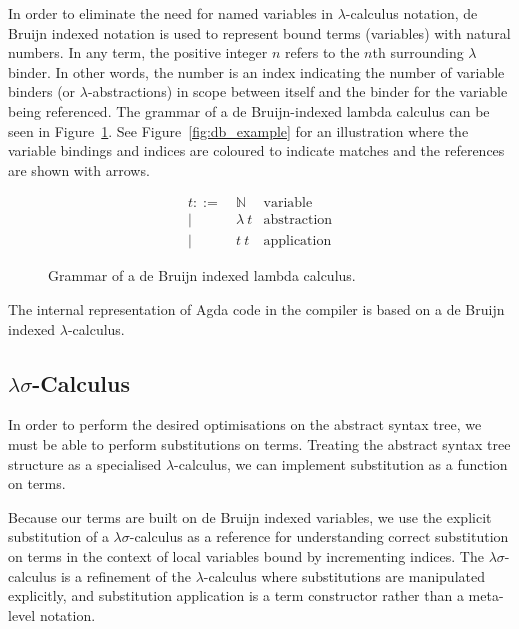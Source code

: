 In order to eliminate the need for named variables in $\lambda$-calculus notation, de Bruijn indexed notation is used to represent bound terms (variables) with natural numbers. In any term, the positive integer $n$ refers to the $n$th surrounding $\lambda$ binder.\citep{deBruijn-1972} In other words, the number is an index indicating the number of variable binders (or $\lambda$-abstractions) in scope between itself and the binder for the variable being referenced. The grammar of a de Bruijn-indexed lambda calculus can be seen in Figure~\ref{fig:db_lambda_calc}. See Figure~\ref{fig:db_example} for an illustration where the variable bindings and indices are coloured to indicate matches and the references are shown with arrows.



\begin{figure}[h]
\begin{align*}
t ::=~& \mathbb{N}      & \text{variable}\\
    |~& \lambda~t       & \text{abstraction}\\
    |~& t~t             & \text{application}
\end{align*}
\caption{Grammar of a de Bruijn indexed lambda calculus.}
\label{fig:db_lambda_calc}
\end{figure}

The internal representation of Agda code in the compiler is based on a de Bruijn indexed $\lambda$-calculus.

\subsection{$\lambda\sigma$-Calculus}

In order to perform the desired optimisations on the abstract syntax tree, we must be able to perform substitutions on terms. Treating the abstract syntax tree structure as a specialised $\lambda$-calculus, we can implement substitution as a function on terms.

Because our terms are built on de Bruijn indexed variables, we use the explicit substitution of a $\lambda\sigma$-calculus as a reference for understanding correct substitution on terms in the context of local variables bound by incrementing indices. The $\lambda\sigma$-calculus is a refinement of the $\lambda$-calculus where substitutions are manipulated explicitly, and substitution application is a term constructor rather than a meta-level notation.\citep{Abadi-Cardelli-Curien-Levy-1990}

